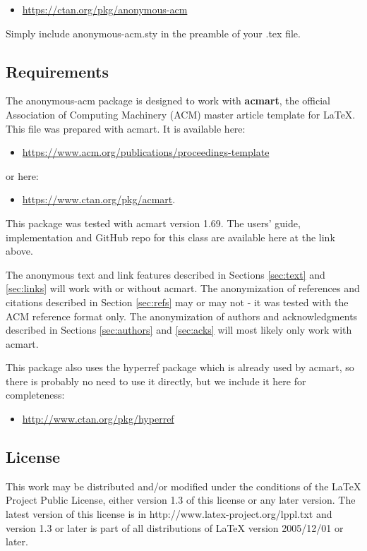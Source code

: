 \documentclass[sigconf, balance=false]{acmart}
\begin{document}
\begin{itemize}
    \item \url{https://ctan.org/pkg/anonymous-acm}
\end{itemize}
\noindent Simply include anonymous-acm.sty in the preamble of your .tex file.

\subsection{Requirements}
\label{sec:reqs}
The anonymous-acm package is designed to work with \textbf{acmart}, the official Association of Computing Machinery (ACM) master article template for \LaTeX. This file was prepared with acmart. It is available here:
\begin{itemize}
\item \url{https://www.acm.org/publications/proceedings-template} 
\end{itemize}

\noindent or here: 
\begin{itemize}
    \item \url{https://www.ctan.org/pkg/acmart}. 
\end{itemize}
This package was tested with acmart version 1.69. The users' guide, implementation and GitHub repo for this class are available here at the link above.  

The anonymous text and link features described in Sections \ref{sec:text} and \ref{sec:links} will work with or without acmart. The anonymization of references and citations described in Section \ref{sec:refs} may or may not - it was tested with the ACM reference format only. The anonymization of authors and acknowledgments described in Sections \ref{sec:authors} and \ref{sec:acks} will most likely only work with acmart.   
 
This package also uses the hyperref package which is already used by acmart, so there is probably no need to use it directly, but we include it here for completeness:

\begin{itemize}
    \item \url{http://www.ctan.org/pkg/hyperref}
\end{itemize}

\subsection{License}
This work may be distributed and/or modified under the conditions of the LaTeX Project Public License, either version 1.3 of this license or any later version. The latest version of this license is in  http://www.latex-project.org/lppl.txt and version 1.3 or later is part of all distributions of LaTeX version 2005/12/01 or later.
\end{document}
